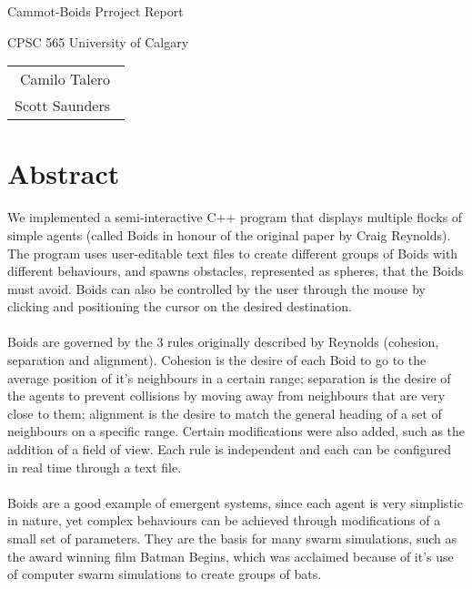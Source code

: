 \documentclass[12pt]{article}
\begin{document}
\thispagestyle{empty}
\begin{titlepage}
	\null\vfill
	
	\begin{center}
		
		{\Huge Cammot-Boids Prroject Report}
		\vskip 2cm
		
		{\large CPSC 565 University of Calgary}
	\end{center}
	
	\vfill
	\vfill
	
	\begin{tabular}{r}
		Camilo Talero\ \\
		Scott Saunders\    
	\end{tabular}
	\hfill
\end{titlepage}

	
\newpage
\clearpage
\setcounter{page}{1}

\section*{Abstract}

\indent We implemented a semi-interactive C++ program that displays multiple flocks of simple agents (called Boids in honour of the original paper by Craig Reynolds). The program uses user-editable text files to create different groups of Boids with different behaviours, and spawns obstacles, represented as spheres, that the Boids must avoid. Boids can also be controlled by the user through the mouse by clicking and positioning the cursor on the desired destination. 
\\ \\
Boids are governed by the 3 rules originally described by Reynolds (cohesion, separation and alignment). Cohesion is the desire of each Boid to go to the average position of it's neighbours in a certain range; separation is the desire of the agents to prevent collisions by moving away from neighbours that are very close to them; alignment is the desire to match the general heading of a set of neighbours on a specific range. Certain modifications were also added, such as the addition of a field of view. Each rule is independent and each can be configured in real time through a text file. 
\\ \\
Boids are a good example of emergent systems, since each agent is very simplistic in nature, yet complex behaviours can be achieved through modifications of a small set of parameters. They are the basis for many swarm simulations, such as the award winning film Batman Begins, which was acclaimed because of it's use of computer swarm simulations to create groups of bats.
\end{document}
